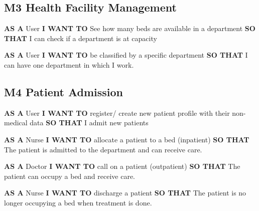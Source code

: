 \subsection*{M3 Health Facility Management}

\textbf{AS A} User\newline
\textbf {I WANT TO} See how many beds are available in a department\newline
\textbf {SO THAT} I can check if a department is at capacity\newline

\textbf{AS A} User\newline
\textbf {I WANT TO} be classified by a specific department\newline
\textbf {SO THAT} I can have one department in which I work.\newline

\medbreak
\noindent
\subsection*{M4 Patient Admission}

\textbf {AS A} User\newline
\textbf {I WANT TO} register/ create new patient profile with their non-medical data\newline
\textbf {SO THAT} I admit new patients\newline
\newline

\textbf{AS A} Nurse\newline
\textbf{I WANT TO} allocate a patient to a bed (inpatient)\newline
\textbf{SO THAT} The patient is admitted to the department and can receive care.\newline
\newline

\textbf{AS A} Doctor\newline
\textbf{I WANT TO} call on a patient (outpatient)\newline
\textbf{SO THAT} The patient can occupy a bed and receive care.\newline
\newline

\textbf{AS A} Nurse\newline
\textbf{I WANT TO} discharge a patient\newline
\textbf{SO THAT} The patient is no longer occupying a bed when treatment is done.\newline
\newline

